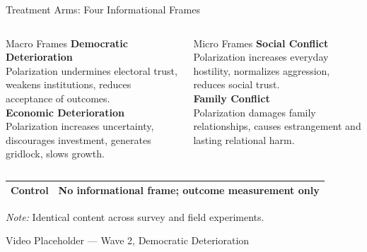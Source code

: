\documentclass[aspectratio=169]{beamer}
\begin{document}
\begin{frame}{Treatment Arms: Four Informational Frames}
  \begin{columns}[T]
      \begin{block}{\textcolor{macroC}{Macro Frames}}
        \vspace{0.3em}
        \textbf{Democratic Deterioration}\\
        Polarization undermines electoral trust, weakens institutions, reduces acceptance of outcomes.\\[8pt]
        \textbf{Economic Deterioration}\\
        Polarization increases uncertainty, discourages investment, generates gridlock, slows growth.
      \end{block}
      \begin{block}{\textcolor{microC}{Micro Frames}}
        \vspace{0.3em}
        \textbf{Social Conflict}\\
        Polarization increases everyday hostility, normalizes aggression, reduces social trust.\\[8pt]
        \textbf{Family Conflict}\\
        Polarization damages family relationships, causes estrangement and lasting relational harm.
      \end{block}
  \end{columns}
  \vspace{0.6em}
  \begin{center}
    \begin{tabular}{>{\centering\arraybackslash}p{2cm}>{\centering\arraybackslash}p{8cm}}
      \hline
      \textbf{Control} & No informational frame; outcome measurement only \\
      \hline
    \end{tabular}
  \end{center}
  {\small \textit{Note:} Identical content across survey and field experiments.}
\end{frame}

\begin{frame}{Video Placeholder — Wave 2, Democratic Deterioration}
  \begin{center}
  \end{center}
\end{frame}
\end{document}

